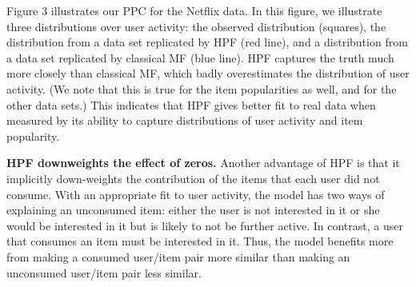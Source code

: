 Figure 3 illustrates our PPC for the Netflix data.  In this figure, we
illustrate three distributions over user activity: the observed
distribution (squares), the distribution from a data set replicated by
HPF (red line), and a distribution from a data set replicated by
classical MF (blue line).  HPF captures the truth much more closely
than classical MF, which badly overestimates the distribution of user
activity.  (We note that this is true for the item popularities as
well, and for the other data sets.) This indicates that HPF gives
better fit to real data when measured by its ability to capture
distributions of user activity and item popularity.



{\bf HPF downweights the effect of zeros.}  Another advantage of HPF
is that it implicitly down-weights the contribution of the items that
each user did not consume.  With an appropriate fit to user activity,
the model has two ways of explaining an unconsumed item: either the
user is not interested in it or she would be interested in it but is
likely to not be further active. In contrast, a user that consumes an
item must be interested in it.  Thus, the model benefits more from
making a consumed user/item pair more similar than making an
unconsumed user/item pair less similar.

